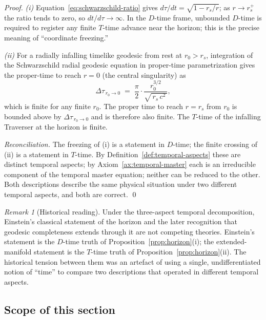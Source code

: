 \documentclass[11pt,a4paper]{article}
\theoremstyle{definition}
\theoremstyle{remark}
\newtheorem{remark}[theorem]{Remark}
\begin{document}
\begin{proof}
\emph{(i)} Equation~\eqref{eq:schwarzschild-ratio} gives $d\tau/dt = \sqrt{1 - r_{s}/r}$; as $r \to r_{s}^{+}$ the ratio tends to zero, so $dt/d\tau \to \infty$. In the $D$-time frame, unbounded $D$-time is required to register any finite $T$-time advance near the horizon; this is the precise meaning of ``coordinate freezing.''

\emph{(ii)} For a radially infalling timelike geodesic from rest at $r_{0} > r_{s}$, integration of the Schwarzschild radial geodesic equation in proper-time parametrization gives the proper-time to reach $r=0$ (the central singularity) as
\[
\Delta\tau_{\,r_{0}\to 0} \;=\; \frac{\pi}{2}\cdot\frac{r_{0}^{3/2}}{\sqrt{\,r_{s}\,c^{2}\,}},
\]
which is finite for any finite $r_{0}$. The proper time to reach $r = r_{s}$ from $r_{0}$ is bounded above by $\Delta\tau_{\,r_{0}\to 0}$ and is therefore also finite. The $T$-time of the infalling Traverser at the horizon is finite.

\emph{Reconciliation.} The freezing of (i) is a statement in $D$-time; the finite crossing of (ii) is a statement in $T$-time. By Definition~\ref{def:temporal-aspects} these are distinct temporal aspects; by Axiom~\ref{ax:temporal-master} each is an irreducible component of the temporal master equation; neither can be reduced to the other. Both descriptions describe the same physical situation under two different temporal aspects, and both are correct. \qed
\end{proof}

\begin{remark}[Historical reading]\label{rem:horizon-historical}
Under the three-aspect temporal decomposition, Einstein's classical statement of the horizon and the later recognition that geodesic completeness extends through it are not competing theories. Einstein's statement is the $D$-time truth of Proposition~\ref{prop:horizon}(i); the extended-manifold statement is the $T$-time truth of Proposition~\ref{prop:horizon}(ii). The historical tension between them was an artefact of using a single, undifferentiated notion of ``time'' to compare two descriptions that operated in different temporal aspects.
\end{remark}

\subsection{Scope of this section}\label{subsec:temporal-scope}
\end{document}
